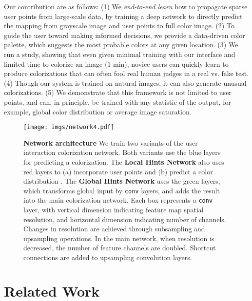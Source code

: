 \documentclass[acmtog,authorversion]{acmart}
\begin{document}
Our contribution are as follows: (1) We \textit{end-to-end learn} how to propagate sparse user points from large-scale data, by training a deep network to directly predict the mapping from grayscale image and user points to full color image. (2) To guide the user toward making informed decisions, we provide a data-driven color palette, which suggests the most probable colors at any given location. (3) We run a study, showing that even given minimal training with our interface and limited time to colorize an image (1 min), novice users can quickly learn to produce colorizations that can often fool real human judges in a real vs. fake test. (4) Though our system is trained on natural images, it can also generate unusual colorizations. (5) We demonstrate that this framework is not limited to user points, and can, in principle, be trained with any statistic of the output, for example, global color distribution or average image saturation.
 \begin{figure*}[t!]
\centering
\texttt{[image: imgs/network4.pdf]}
\vspace{-5mm}
\caption{\textbf{Network architecture} We train two variants of the user interaction colorization network. Both variants use the blue layers for predicting a colorization. The \textbf{Local Hints Network} also uses red layers to (a) incorporate user points  and (b) predict a color distribution . The \textbf{Global Hints Network} uses the green layers, which transforms global input  by  \texttt{conv} layers, and adds the result into the main colorization network. Each box represents a \texttt{conv} layer, with vertical dimension indicating feature map spatial resolution, and horizontal dimension indicating number of channels. Changes in resolution are achieved through subsampling and upsampling operations. In the main network, when resolution is decreased, the number of feature channels are doubled. Shortcut connections are added to upsampling convolution layers.}
\label{fig:network}
\vspace{-2mm}
\end{figure*}

\section{Related Work}
\end{document}
